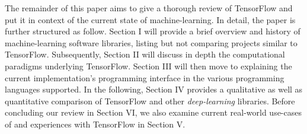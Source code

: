 The remainder of this paper aims to give a thorough review of TensorFlow and put
it in context of the current state of machine-learning. In detail, the paper is
further structured as follow. Section I will provide a brief overview and
history of machine-learning software libraries, listing but not comparing
projects similar to TensorFlow. Subsequently, Section II will discuss in depth
the computational paradigms underlying TensorFlow. Section III will then move to
explaining the current implementation's programming interface in the various
programming languages supported. In the following, Section IV provides a
qualitative as well as quantitative comparison of TensorFlow and other
\emph{deep-learning} libraries. Before concluding our review in Section VI, we
also examine current real-world use-cases of and experiences with TensorFlow in
Section V.

